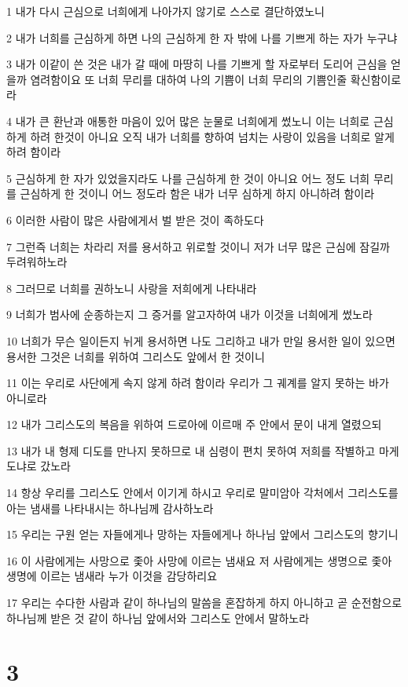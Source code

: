 \par 1 내가 다시 근심으로 너희에게 나아가지 않기로 스스로 결단하였노니
\par 2 내가 너희를 근심하게 하면 나의 근심하게 한 자 밖에 나를 기쁘게 하는 자가 누구냐
\par 3 내가 이같이 쓴 것은 내가 갈 때에 마땅히 나를 기쁘게 할 자로부터 도리어 근심을 얻을까 염려함이요 또 너희 무리를 대하여 나의 기쁨이 너희 무리의 기쁨인줄 확신함이로라
\par 4 내가 큰 환난과 애통한 마음이 있어 많은 눈물로 너희에게 썼노니 이는 너희로 근심하게 하려 한것이 아니요 오직 내가 너희를 향하여 넘치는 사랑이 있음을 너희로 알게 하려 함이라
\par 5 근심하게 한 자가 있었을지라도 나를 근심하게 한 것이 아니요 어느 정도 너희 무리를 근심하게 한 것이니 어느 정도라 함은 내가 너무 심하게 하지 아니하려 함이라
\par 6 이러한 사람이 많은 사람에게서 벌 받은 것이 족하도다
\par 7 그런즉 너희는 차라리 저를 용서하고 위로할 것이니 저가 너무 많은 근심에 잠길까 두려워하노라
\par 8 그러므로 너희를 권하노니 사랑을 저희에게 나타내라
\par 9 너희가 범사에 순종하는지 그 증거를 알고자하여 내가 이것을 너희에게 썼노라
\par 10 너희가 무슨 일이든지 뉘게 용서하면 나도 그리하고 내가 만일 용서한 일이 있으면 용서한 그것은 너희를 위하여 그리스도 앞에서 한 것이니
\par 11 이는 우리로 사단에게 속지 않게 하려 함이라 우리가 그 궤계를 알지 못하는 바가 아니로라
\par 12 내가 그리스도의 복음을 위하여 드로아에 이르매 주 안에서 문이 내게 열렸으되
\par 13 내가 내 형제 디도를 만나지 못하므로 내 심령이 편치 못하여 저희를 작별하고 마게도냐로 갔노라
\par 14 항상 우리를 그리스도 안에서 이기게 하시고 우리로 말미암아 각처에서 그리스도를 아는 냄새를 나타내시는 하나님께 감사하노라
\par 15 우리는 구원 얻는 자들에게나 망하는 자들에게나 하나님 앞에서 그리스도의 향기니
\par 16 이 사람에게는 사망으로 좇아 사망에 이르는 냄새요 저 사람에게는 생명으로 좇아 생명에 이르는 냄새라 누가 이것을 감당하리요
\par 17 우리는 수다한 사람과 같이 하나님의 말씀을 혼잡하게 하지 아니하고 곧 순전함으로 하나님께 받은 것 같이 하나님 앞에서와 그리스도 안에서 말하노라

\chapter{3}

